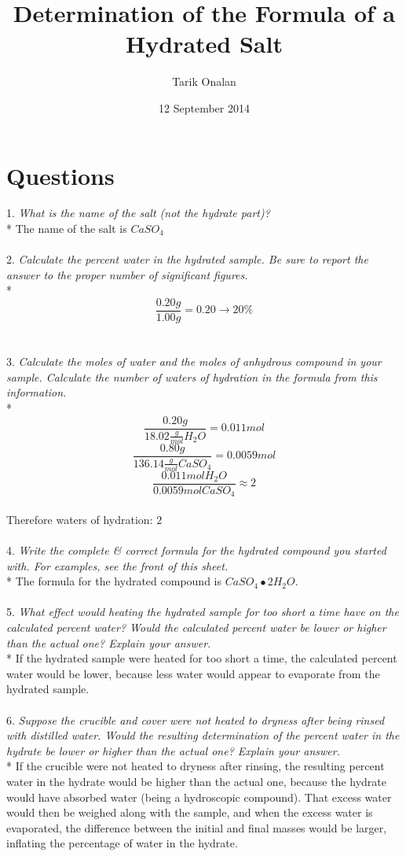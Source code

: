 \documentclass[a4paper]{article}
\title{Determination of the Formula of a Hydrated Salt}
\date{12 September 2014}
\author{Tarik Onalan}
\begin{document}
    \maketitle
    \section{Questions}
        1. \textit{What is the name of the salt (not the hydrate part)?} \\*
        The name of the salt is \(CaSO_{4}\) \\\\
        2. \textit{Calculate the percent water in the hydrated sample. Be sure to
        report the answer to the proper number of significant figures.} \\*
        \[\frac{0.20g}{1.00g}=0.20\to20\%\] \\\\
        3. \textit{Calculate the moles of water and the moles of anhydrous compound
        in your sample. Calculate the number of waters of hydration in the formula
        from this information.} \\*
        \[\frac{0.20g}{18.02\frac{g}{mol} H_{2}O}=0.011mol\]
        \[\frac{0.80g}{136.14\frac{g}{mol} CaSO_{4}}=0.0059mol\]
        \[\frac{0.011mol H_{2}O}{0.0059mol CaSO_{4}}\approx2\] \\
        Therefore waters of hydration: \(2\) \\\\
        4. \textit{Write the complete \& correct formula for the hydrated compound you
        started with. For examples, see the front of this sheet.} \\*
        The formula for the hydrated compound is \(CaSO_{4}\bullet{2H_{2}O}\). \\\\
        5. \textit{What effect would heating the hydrated sample for too short a time
        have on the calculated percent water? Would the calculated percent water be
        lower or higher than the actual one? Explain your answer.} \\*
        If the hydrated sample were heated for too short a time, the calculated percent
        water would be lower, because less water would appear to evaporate from the
        hydrated sample. \\\\
        6. \textit{Suppose the crucible and cover were not heated to dryness after
        being rinsed with distilled water. Would the resulting determination of the
        percent water in the hydrate be lower or higher than the actual one? Explain
        your answer.} \\*
        If the crucible were not heated to dryness after rinsing, the resulting percent
        water in the hydrate would be higher than the actual one, because the hydrate
        would have absorbed water (being a hydroscopic compound). That excess water
        would then be weighed along with the sample, and when the excess water is
        evaporated, the difference between the initial and final masses would be
        larger, inflating the percentage of water in the hydrate. \\\\
\end{document}
